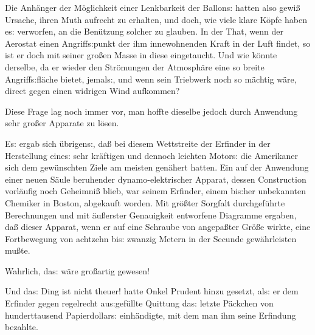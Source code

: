 \documentclass[oneside,12pt]{book}
\newcommand{\s}{s:}
\begin{document}
Die Anh\"anger der M\"oglichkeit einer Lenkbarkeit der Ballon{\s}
hatten also gewi{\ss} Ursache, ihren Muth aufrecht zu erhalten, und
doch, wie viele klare K\"opfe haben e{\s} verworfen, an die
Ben\"utzung solcher zu glauben. In der That, wenn der Aerostat einen
Angriff{\s}punkt der ihm innewohnenden Kraft in der Luft findet, so
ist er doch mit seiner gro{\ss}en Masse in diese eingetaucht. Und wie
k\"onnte derselbe, da er wieder den Str\"omungen der Atmosph\"are
eine so breite Angriff{\s}fl\"ache bietet, jemal{\s}, und wenn sein
Triebwerk noch so m\"achtig w\"are, direct gegen einen widrigen Wind
aufkommen?

Diese Frage lag noch immer vor, man hoffte dieselbe jedoch durch
Anwendung sehr gro{\ss}er Apparate zu l\"osen.

E{\s} ergab sich \"ubrigen{\s}, da{\ss} bei diesem Wettstreite der
Erfinder in der Herstellung eine{\s} sehr kr\"aftigen und dennoch
leichten Motor{\s} die Amerikaner sich dem gew\"unschten Ziele am
meisten gen\"ahert hatten. Ein auf der Anwendung einer neuen S\"aule
beruhender dynamo-elektrischer Apparat, dessen Construction
vorl\"aufig noch Geheimni{\ss} blieb, war seinem Erfinder, einem
bi{\s}her unbekannten Chemiker in Boston, abgekauft worden. Mit
gr\"o{\ss}ter Sorgfalt durchgef\"uhrte Berechnungen und mit
\"au{\ss}erster Genauigkeit entworfene Diagramme ergaben, da{\ss}
dieser Apparat, wenn er auf eine Schraube von angepa{\ss}ter
Gr\"o{\ss}e wirkte, eine Fortbewegung von acht\/zehn bi{\s} zwanzig
Metern in der Secunde gew\"ahrleisten mu{\ss}te.

Wahrlich, da{\s} w\"are gro{\ss}artig gewesen!

{\glqq}Und da{\s} Ding ist nicht theuer!{\grqq} hatte Onkel Prudent
hinzu gesetzt, al{\s} er dem Erfinder gegen regelrecht
au{\s}gef\"ullte Quittung da{\s} letzte P\"ackchen von hunderttausend
Papierdollar{\s} einh\"andigte, mit dem man ihm seine Erfindung
bezahlte.
\end{document}

